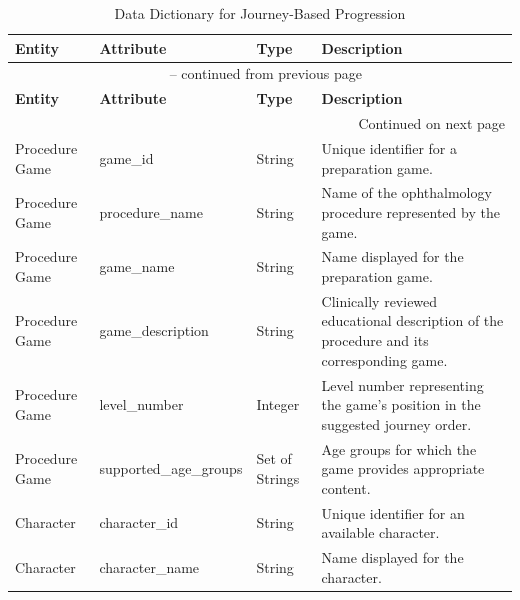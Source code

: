 \documentclass[10pt]{article}
\begin{document}
\begin{longtable}{
    p{}
    p{}
    p{}
    p{}
}

\caption{Data Dictionary for Journey-Based Progression}
\label{tab:JourneyDataDictionary}\\

\toprule
\textbf{Entity} &
\textbf{Attribute} &
\textbf{Type} &
\textbf{Description} \\
\midrule
\endfirsthead

\multicolumn{4}{c}{\tablename\ \thetable{} -- continued from previous page} \\
\toprule
\textbf{Entity} &
\textbf{Attribute} &
\textbf{Type} &
\textbf{Description} \\
\midrule
\endhead

\midrule
\multicolumn{4}{r}{Continued on next page} \\
\endfoot

\bottomrule
\endlastfoot

Procedure Game &
game\_id &
String &
Unique identifier for a preparation game. \\
\midrule

Procedure Game &
procedure\_name &
String &
Name of the ophthalmology procedure represented
by the game. \\
\midrule

Procedure Game &
game\_name &
String &
Name displayed for the preparation game. \\
\midrule

Procedure Game &
game\_description &
String &
Clinically reviewed educational description
of the procedure and its corresponding game. \\
\midrule

Procedure Game &
level\_number &
Integer &
Level number representing the game's position
in the suggested journey order. \\
\midrule

Procedure Game &
supported\_age\_groups &
Set of Strings &
Age groups for which the game provides
appropriate content. \\
\midrule

Character &
character\_id &
String &
Unique identifier for an available character. \\
\midrule

Character &
character\_name &
String &
Name displayed for the character. \\
\midrule


\end{longtable}
\end{document}

